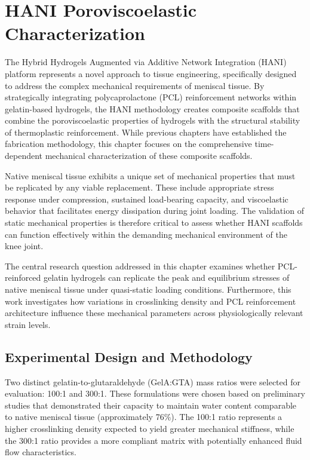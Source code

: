 \chapter{HANI Poroviscoelastic Characterization}\label{chap:5}

The Hybrid Hydrogels Augmented via Additive Network Integration (HANI) platform represents a novel approach to tissue engineering, specifically designed to address the complex mechanical requirements of meniscal tissue. By strategically integrating polycaprolactone (PCL) reinforcement networks within gelatin-based hydrogels, the HANI methodology creates composite scaffolds that combine the poroviscoelastic properties of hydrogels with the structural stability of thermoplastic reinforcement. While previous chapters have established the fabrication methodology, this chapter focuses on the comprehensive time-dependent mechanical characterization of these composite scaffolds.

Native meniscal tissue exhibits a unique set of mechanical properties that must be replicated by any viable replacement. These include appropriate stress response under compression, sustained load-bearing capacity, and viscoelastic behavior that facilitates energy dissipation during joint loading. The validation of static mechanical properties is therefore critical to assess whether HANI scaffolds can function effectively within the demanding mechanical environment of the knee joint.

The central research question addressed in this chapter examines whether PCL-reinforced gelatin hydrogels can replicate the peak and equilibrium stresses of native meniscal tissue under quasi-static loading conditions. Furthermore, this work investigates how variations in crosslinking density and PCL reinforcement architecture influence these mechanical parameters across physiologically relevant strain levels.

\section{Experimental Design and Methodology}

Two distinct gelatin-to-glutaraldehyde (GelA:GTA) mass ratios were selected for evaluation: 100:1 and 300:1. These formulations were chosen based on preliminary studies that demonstrated their capacity to maintain water content comparable to native meniscal tissue (approximately 76\%). The 100:1 ratio represents a higher crosslinking density expected to yield greater mechanical stiffness, while the 300:1 ratio provides a more compliant matrix with potentially enhanced fluid flow characteristics.

